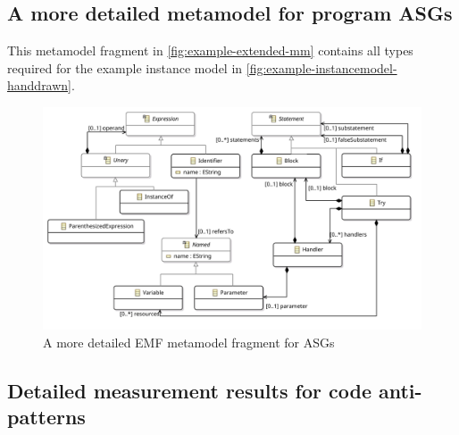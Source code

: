 \appendix
\chapter*{\fuggelek}
\setcounter{chapter}{\appendixnumber}

\section{A more detailed metamodel for program ASGs}

This metamodel fragment in \autoref{fig:example-extended-mm} contains all types required for the example instance model in \autoref{fig:example-instancemodel-handdrawn}.

\begin{figure}[!htp]
	\centering
	\includegraphics[width=\textwidth]{figures/pdfs/example-metamodel-extended-edited.pdf}
	\caption[~A more detailed EMF metamodel fragment for ASGs]{A more detailed EMF metamodel fragment for ASGs}
	\label{fig:example-extended-mm}
\end{figure}



\clearpage\section{Detailed measurement results for code anti-patterns}
\label{appendix:csmr-results}

